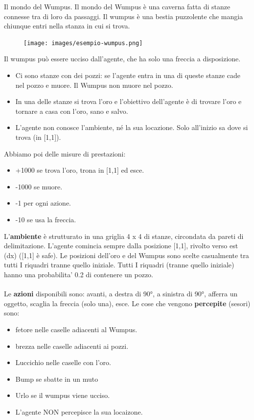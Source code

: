 \begin{example}
    Il mondo del Wumpus. Il mondo del Wumpus è una caverna fatta di stanze connesse tra di loro da
    passaggi. Il wumpus è una bestia puzzolente che mangia chiunque entri nella stanza in
    cui si trova. 
    \begin{figure}[h!]
        \centering
        \texttt{[image: images/esempio-wumpus.png]}
    \end{figure}
    Il wumpus può essere ucciso dall’agente, che ha solo una freccia a disposizione.
    \begin{itemize}
        \item Ci sono stanze con dei pozzi: se l’agente entra in una di queste stanze cade nel pozzo e muore. Il Wumpus non muore nel pozzo.
        \item In una delle stanze si trova l’oro e l’obiettivo dell’agente è di trovare l’oro e tornare a casa con l’oro, sano e salvo.
        \item L’agente non conosce l’ambiente, né la sua locazione. Solo all’inizio sa dove si trova (in [1,1]).
    \end{itemize}
    Abbiamo poi delle misure di prestazioni:
    \begin{itemize}
        \item +1000 se trova l'oro, trona in [1,1] ed esce.
        \item -1000 se muore.
        \item -1 per ogni azione.
        \item -10 se usa la freccia.
    \end{itemize}
    L'\textbf{ambiente} è strutturato in una griglia 4 x 4 di stanze, circondata da pareti di delimitazione.
    L’agente comincia sempre dalla posizione [1,1], rivolto verso est (dx) ([1,1] è safe).
    Le posizioni dell’oro e del Wumpus sono scelte casualmente tra tutti I riquadri tranne quello iniziale.
    Tutti I riquadri (tranne quello iniziale) hanno una probabilita’ 0.2 di contenere un pozzo.\\\\
    Le \textbf{azioni} disponibili sono: avanti, a destra di 90°, a sinistra di 90°, afferra un oggetto, scaglia la freccia (solo una), esce.
    Le cose che vengono \textbf{percepite} (sesori) sono:
    \begin{itemize}
        \item fetore nelle caselle adiacenti al Wumpus.
        \item brezza nelle caselle adiacenti ai pozzi.
        \item Luccichio nelle caselle con l'oro.
        \item Bump se sbatte in un muto
        \item Urlo se il wumpus viene ucciso.
        \item L'agente NON percepisce la sua locaizone.
    \end{itemize}
\end{example}

